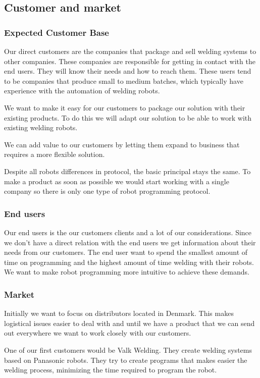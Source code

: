\subsection{Customer and market}

\subsubsection{Expected Customer Base}
Our direct customers are the companies that package and sell welding systems to other companies. 
These companies are responsible for getting in contact with the end users. 
They will know their needs and how to reach them. 
These users tend to be companies that produce small to medium batches, which typically have experience with the automation of welding robots.

We want to make it easy for our customers to package our solution with their existing products.
To do this we will adapt our solution to be able to work with existing welding robots.

We can add value to our customers by letting them expand to business that requires a more flexible solution.

Despite all robots differences in protocol, the basic principal stays the same.
To make a product as soon as possible we would start working with a single company so there is only one type of robot programming protocol.

\subsubsection{End users}
Our end users is the our customers clients and a lot of our considerations.
Since we don't have a direct relation with the end users we get information about their needs from our customers.
The end user want to spend the smallest amount of time on programming and the highest amount of time welding with their robots.
We want to make robot programming more intuitive to achieve these demands.

\subsubsection{Market}
Initially we want to focus on distributors located in Denmark.
This makes logistical issues easier to deal with and until we have a product that we can send out everywhere we want to work closely with our customers.

One of our first customers would be Valk Welding. They create welding systems based on Panasonic robots. They try to create programs that makes easier the welding process, minimizing the time required to program the robot.

